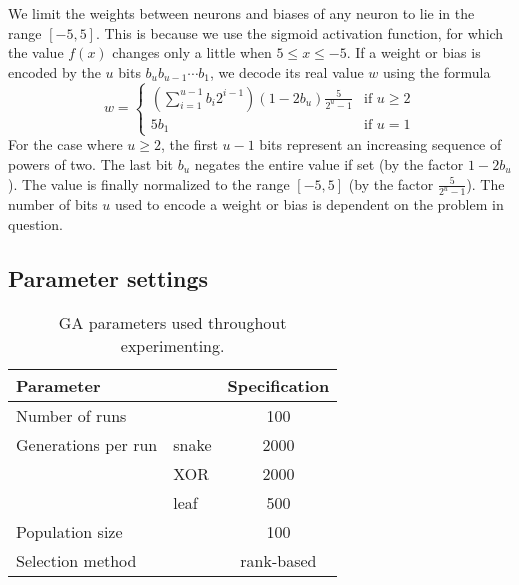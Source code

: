 We limit the weights between neurons and biases of any neuron to lie in the range $[-5,5]$.
This is because we use the sigmoid activation function, for which the value $f(x)$ changes only a little when $5 \leq x \leq -5$. If a weight or bias is encoded by the $u$ bits $b_u b_{u-1} \cdots b_1$, we decode its real value $w$ using the formula
%
\begin{equation*}\label{eq:weightdecoding}
  w =
  \begin{cases}
    \left(\sum_{i=1}^{u-1}b_i2^{i-1}\right)\left(1-2b_u\right)\frac{5}{2^u-1}  & \text{if } u \geq 2 \\
    5b_1                                                        & \text{if } u = 1
  \end{cases}
\end{equation*}
%
For the case where $u \geq 2$, the first $u-1$ bits represent an increasing sequence of powers of two. The last bit $b_u$ negates the entire value if set (by the factor $1-2b_u$). The value is finally normalized to the range $[-5, 5]$ (by the factor $\frac{5}{2^u-1}$).
The number of bits $u$ used to encode a weight or bias is dependent on the problem in question.





\subsection{Parameter settings}

\begin{table}
  \centering
  \begin{tabular}{l l S}
    \toprule
    Parameter & & {Specification} \\
    \midrule
    Number of runs & & 100 \\
    Generations per run & snake & 2000 \\
    & XOR & 2000 \\
    & leaf & 500 \\
    Population size & & 100 \\
    Selection method & & {rank-based} \\
    \bottomrule
  \end{tabular}
  \caption{GA parameters used throughout experimenting.}
  \label{tab:gaparam}
\end{table}

